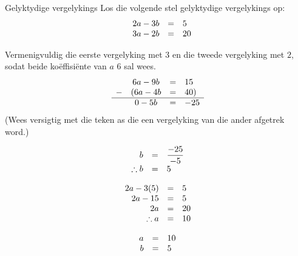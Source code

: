 \begin{aktiwiteit}{}
\begin{wex}
{Gelyktydige vergelykings}
{
Los die volgende stel gelyktydige vergelykings op:
\begin{equation*}
\begin{array}{cccc}\hfill & 2a - 3b& =& 5\hfill \\ 
\hfill& 3a-2b& =& 20\hfill 
\end{array}
\end{equation*}
}
{
Vermenigvuldig die eerste vergelyking met $3$ en die tweede vergelyking met $2$, sodat beide ko\"effisi\"ente van $a$ $6$ sal wees.
\begin{equation*}
\begin{array}{cccc}\hfill & 6a-9b& =& 15\hfill \\ 
\hfill- & (6a-4b& =& 40)\hfill \\ \hline
 \hfill & 0 - 5b &=& -25 

\end{array}
\end{equation*}
(Wees versigtig met die teken as die een vergelyking van die ander afgetrek word.)

\begin{equation*}
    \begin{array}{ccl}
 \hfill b &=& \dfrac{-25}{-5} \\
 \hfill \therefore b &=& 5
    \end{array}
\end{equation*}

\begin{equation*}
    \begin{array}{ccl}\hfill 2a - 3(5)&=& 5\\
	\hfill 2a-15 & =& 5\\
	\hfill 2a & =& 20\\
	\hfill \therefore a & =& 10 
   \end{array}
\end{equation*}


\begin{equation*}
\begin{array}{ccc}
 \hfill a& =& 10\hfill \\
\hfill b& =& 5\hfill 
\end{array}
\end{equation*}
}
\end{wex}



\end{aktiwiteit}
